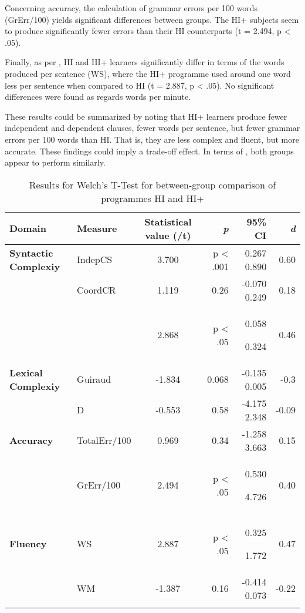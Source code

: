 \documentclass[output=paper]{langsci/langscibook}
\begin{document}
Concerning accuracy, the calculation of grammar errors per 100 words (GrErr/100) yields significant differences between groups. The HI+ subjects seem to produce significantly fewer errors than their HI counterparts (t = 2.494, p < .05). 

Finally, as per , HI and HI+ learners significantly differ in terms of the words produced per sentence (WS), where the HI+ programme used around one word less per sentence when compared to HI (t = 2.887,  p < .05).  No significant differences were found as regards words per minute.

These results could be summarized by noting that HI+ learners produce fewer independent and dependent clauses, fewer words per sentence, but fewer grammar errors per 100 words than HI. That is, they are less complex and fluent, but more accurate. These findings could imply a trade-off effect. In terms of , both groups appear to perform similarly.  

\begin{table}
\begin{tabularx}{\textwidth}{Ql Srrr}
\lsptoprule
 \bfseries Domain & \bfseries Measure & \bfseries Statistical value (/t) & \bfseries \textit{p} & \bfseries 95\% CI & \bfseries \textit{d}\\
 \midrule 
\bfseries Syntactic Complexiy & IndepCS & 3.700 & p < .001 & {0.267} 0.890 & 0.60\\
& CoordCR & 1.119 & 0.26 & {-0.070  0.249} & 0.18\\
&  & 2.868 & p < .05 & {0.058}

{0.324} & 0.46\\
\bfseries Lexical Complexiy & Guiraud & -1.834 & 0.068 & {-0.135 0.005} & -0.3\\
& D & -0.553 & 0.58 & {-4.175 2.348} & -0.09\\
\bfseries Accuracy & TotalErr/100 & 0.969 & 0.34 & -1.258 3.663 & 0.15\\
& GrErr/100 & 2.494 & p < .05 & {0.530}

4.726 & 0.40\\
\bfseries Fluency & WS & 2.887 & p < .05 & {0.325}

1.772 & 0.47\\
& WM & -1.387 & 0.16 & -0.414  0.073 & -0.22\\
\lspbottomrule
\end{tabularx} 
\caption{ Results for Welch’s T-Test for between-group comparison of programmes HI and HI+}
\label{tab:tejada:7}
\end{table}
\end{document}
